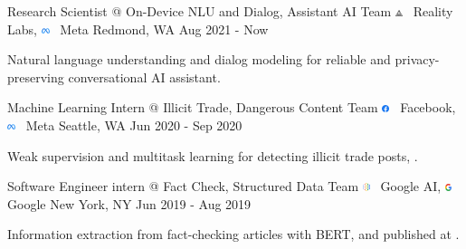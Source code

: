 \documentclass[letterpaper]{awesome-cv}
\begin{document}
\begin{cventries}
  \cventry
    {Research Scientist @ On-Device NLU and Dialog, Assistant AI Team}
    {\includegraphics[width=0.016\textwidth]{../images/logos/rl.png}~ Reality Labs, \hspace{0.2ex} \includegraphics[width=0.018\textwidth]{../images/logos/meta.png}~ Meta}
    {Redmond, WA}
    {Aug 2021 - Now}
    {
      \begin{cvitems}
        \item {Natural language understanding and dialog modeling for reliable and privacy-preserving conversational AI assistant.}
      \end{cvitems}
    }
  \cventry
    {Machine Learning Intern @ Illicit Trade, Dangerous Content Team}
    {\includegraphics[width=0.016\textwidth]{../images/logos/facebook.png}~ Facebook, \hspace{0.2ex} \includegraphics[width=0.018\textwidth]{../images/logos/meta.png}~ Meta}
    {Seattle, WA}
    {Jun 2020 - Sep 2020}
    {
      \begin{cvitems}
        \item {Weak supervision and multitask learning for detecting illicit trade posts, .}
      \end{cvitems}
    }
  \cventry
    {Software Engineer intern @ Fact Check, Structured Data Team}
    {\includegraphics[width=0.016\textwidth]{../images/logos/google_ai.png}~ Google AI, \hspace{0.2ex} \includegraphics[width=0.015\textwidth]{../images/logos/google.png}~ Google}
    {New York, NY}
    {Jun 2019 - Aug 2019}
    {
      \begin{cvitems}
        \item {Information extraction from fact-checking articles with BERT,  and published at .}

\end{cvitems}}
\end{cventries}
\end{document}

